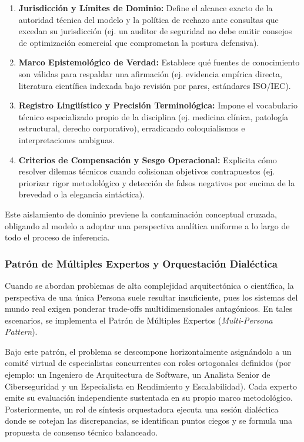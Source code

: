 \begin{enumerate}
    \item \textbf{Jurisdicción y Límites de Dominio:} Define el alcance exacto de la autoridad técnica del modelo y la política de rechazo ante consultas que excedan su jurisdicción (ej. un auditor de seguridad no debe emitir consejos de optimización comercial que comprometan la postura defensiva).
    \item \textbf{Marco Epistemológico de Verdad:} Establece qué fuentes de conocimiento son válidas para respaldar una afirmación (ej. evidencia empírica directa, literatura científica indexada bajo revisión por pares, estándares ISO/IEC).
    \item \textbf{Registro Lingüístico y Precisión Terminológica:} Impone el vocabulario técnico especializado propio de la disciplina (ej. medicina clínica, patología estructural, derecho corporativo), erradicando coloquialismos e interpretaciones ambiguas.
    \item \textbf{Criterios de Compensación y Sesgo Operacional:} Explicita cómo resolver dilemas técnicos cuando colisionan objetivos contrapuestos (ej. priorizar rigor metodológico y detección de falsos negativos por encima de la brevedad o la elegancia sintáctica).
\end{enumerate}

Este aislamiento de dominio previene la contaminación conceptual cruzada, obligando al modelo a adoptar una perspectiva analítica uniforme a lo largo de todo el proceso de inferencia.

\subsubsection{Patrón de Múltiples Expertos y Orquestación Dialéctica}

Cuando se abordan problemas de alta complejidad arquitectónica o científica, la perspectiva de una única Persona suele resultar insuficiente, pues los sistemas del mundo real exigen ponderar trade-offs multidimensionales antagónicos. En tales escenarios, se implementa el Patrón de Múltiples Expertos (\textit{Multi-Persona Pattern}).

Bajo este patrón, el problema se descompone horizontalmente asignándolo a un comité virtual de especialistas concurrentes con roles ortogonales definidos (por ejemplo: un Ingeniero de Arquitectura de Software, un Analista Senior de Ciberseguridad y un Especialista en Rendimiento y Escalabilidad). Cada experto emite su evaluación independiente sustentada en su propio marco metodológico. Posteriormente, un rol de síntesis orquestadora ejecuta una sesión dialéctica donde se cotejan las discrepancias, se identifican puntos ciegos y se formula una propuesta de consenso técnico balanceado.

